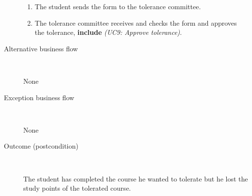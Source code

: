 \begin{description}
\begin{enumerate}
	  	\item The student sends the form to the tolerance committee.
	  	\item The tolerance committee receives and checks the form and approves the
	  	tolerance, \textbf{include} \emph{(UC9: Approve tolerance)}.
	\end{enumerate}
	\item[Alternative business flow] \ 
		\par None
	\item[Exception business flow] \ 
		\par None
	\item[Outcome (postcondition)] \ 
		\par The student has completed the course he wanted to tolerate but he lost
		the study points of the tolerated course.
\end{description}
